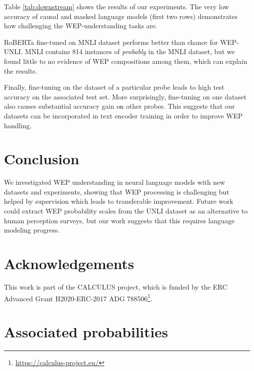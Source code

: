 \documentclass[11pt]{article}
\def \thecolor {black}
\newcommand{\blue}[1]{\textcolor{\thecolor}{#1}}
\begin{document}
Table \ref{tab:downstream} shows the results of our experiments. The very low accuracy of causal and masked language models (first two rows) demonstrates how challenging the WEP-understanding tasks are.

RoBERTa fine-tuned on MNLI dataset performs better than chance for WEP-UNLI. MNLI contains 814 instances of \textit{probably} in the MNLI dataset, but we found little to no evidence of WEP compositions among them, which can explain the results.

Finally, fine-tuning on the dataset of a particular probe leads to high test accuracy on the associated test set. More surprisingly, fine-tuning on one dataset also causes substantial accuracy gain \blue{on} other probes. This suggests that our datasets can be incorporated in text encoder training in order to improve WEP handling. 

\section{Conclusion}

We investigated WEP understanding in neural language models with new datasets and experiments, showing that WEP processing is challenging but helped by supervision which leads to transferable improvement. Future work could extract WEP probability scales from the UNLI dataset as an alternative to human perception surveys, but our work suggests that this requires language modeling progress.

\section{Acknowledgements}
This work is part of the CALCULUS project, which is
funded by the ERC Advanced Grant H2020-ERC-2017 
ADG 788506\footnote{\url{https://calculus-project.eu/}}. 

\nocite{srivastava2022beyond}




\clearpage
\onecolumn
\appendix

\section{Associated probabilities \label{sec:probs}}
\end{document}
